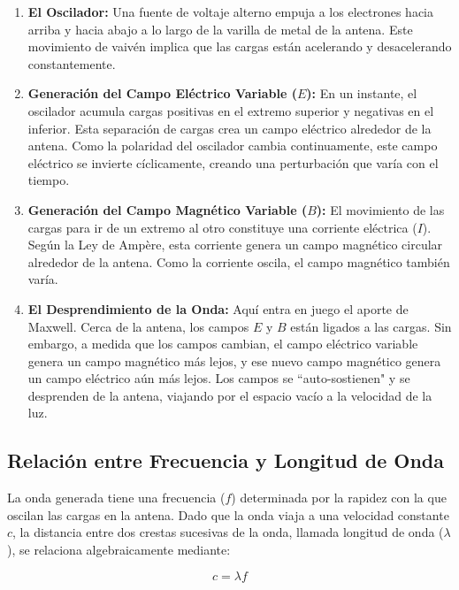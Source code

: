 \documentclass[11pt,a4paper]{book}
\begin{document}
\begin{enumerate}
    \item \textbf{El Oscilador:} Una fuente de voltaje alterno empuja a los electrones hacia arriba y hacia abajo a lo largo de la varilla de metal de la antena. Este movimiento de vaivén implica que las cargas están acelerando y desacelerando constantemente.
    
    \item \textbf{Generación del Campo Eléctrico Variable ($E$):} 
    En un instante, el oscilador acumula cargas positivas en el extremo superior y negativas en el inferior. Esta separación de cargas crea un campo eléctrico alrededor de la antena. Como la polaridad del oscilador cambia continuamente, este campo eléctrico se invierte cíclicamente, creando una perturbación que varía con el tiempo.
    
    \item \textbf{Generación del Campo Magnético Variable ($B$):}
    El movimiento de las cargas para ir de un extremo al otro constituye una corriente eléctrica ($I$). Según la Ley de Ampère, esta corriente genera un campo magnético circular alrededor de la antena. Como la corriente oscila, el campo magnético también varía.
    
    \item \textbf{El Desprendimiento de la Onda:}
    Aquí entra en juego el aporte de Maxwell. Cerca de la antena, los campos $E$ y $B$ están ligados a las cargas. Sin embargo, a medida que los campos cambian, el campo eléctrico variable genera un campo magnético más lejos, y ese nuevo campo magnético genera un campo eléctrico aún más lejos.
    Los campos se ``auto-sostienen" y se desprenden de la antena, viajando por el espacio vacío a la velocidad de la luz.
\end{enumerate}

\subsection{Relación entre Frecuencia y Longitud de Onda}

La onda generada tiene una frecuencia ($f$) determinada por la rapidez con la que oscilan las cargas en la antena. Dado que la onda viaja a una velocidad constante $c$, la distancia entre dos crestas sucesivas de la onda, llamada longitud de onda ($\lambda$), se relaciona algebraicamente mediante:

\begin{equation}
    c = \lambda f
\end{equation}
\end{document}
